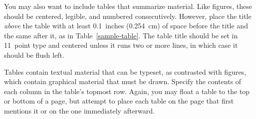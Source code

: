 \documentclass[11pt,letterpaper]{article}
\begin{document}
You may also want to include tables that summarize material. Like 
figures, these should be centered, legible, and numbered consecutively. 
However, place the title {\it above\/} the table with at least 
0.1~inches (0.254~cm) of space before the title and the same after 
it, as in Table~\ref{sample-table}. The table title should be set in
11~point type and centered unless it runs two or more lines, in which
case it should be flush left.

Tables contain textual material that can be typeset, as contrasted 
with figures, which contain graphical material that must be drawn. 
Specify the contents of each column in the table's topmost row. Again,
you may float a table to the top or bottom of a page, but attempt to 
place each table on the page that first mentions it or on the one
immediately afterward. 


\def\w{$\oplus$}
\def\b{$\ominus$}
\def\h{$\odot$}
\end{document}
